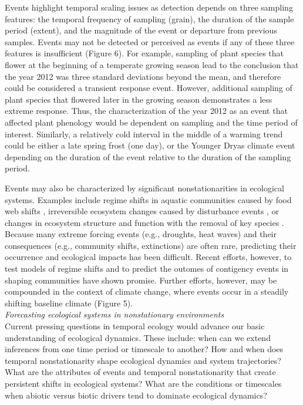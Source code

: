 \documentclass[11pt,a4paper,oneside]{article}
\begin{document}
Events highlight temporal scaling issues as detection depends on three sampling features: the temporal frequency of sampling (grain), the duration of the sample period (extent), and the magnitude of the event or departure from previous samples. Events may not be detected or perceived as events if any of these three features is insufficient (Figure 6). For example, sampling of plant species that flower at the beginning of a temperate growing season lead to the conclusion that the year 2012 was three standard deviations beyond the mean, and therefore could be considered a transient response event. However, additional sampling of plant species that flowered later in the growing season demonstrates a less extreme response. Thus, the characterization of the year 2012 as an event that affected plant phenology would be dependent on sampling and the time period of interest. Similarly, a relatively cold interval in the middle of a warming trend could be either a late spring frost (one day), or the Younger Dryas climate event \citep{Jackson:2009el} depending on the duration of the event relative to the duration of the sampling period. 

Events may also be characterized by significant nonstationarities in ecological systems. Examples include regime shifts in aquatic communities caused by food web shifts \citep{Carpenter2011}, irreversible ecosystem changes caused by disturbance events \citep{Allen1998}, or changes in ecosystem structure and function with the removal of key species \citep{mumby2007}. Because many extreme forcing events (e.g., droughts, heat waves) and their consequences (e.g., community shifts, extinctions) are often rare, predicting their occurrence and ecological impacts has been difficult. Recent efforts, however, to test models of regime shifts \citep{Carpenter2011,Boettiger2013} and to predict the outomes of contigency events in shaping communities \citep{vannette2014} have shown promise. Further efforts, however, may be compounded in the context of climate change, where events occur in a steadily shifting baseline climate (Figure 5). \\

\noindent \emph{Forecasting ecological systems in nonstationary environments}\\
\noindent Current pressing questions in temporal ecology would advance our basic understanding of ecological dynamics. These include: when can we extend inferences from one time period or timescale to another? How and when does temporal nonstationarity shape ecological dynamics and system trajectories? What are the attributes of events and temporal nonstationarity that create persistent shifts in ecological systems? What are the conditions or timescales when abiotic versus biotic drivers tend to dominate ecological dynamics?  
\end{document}
